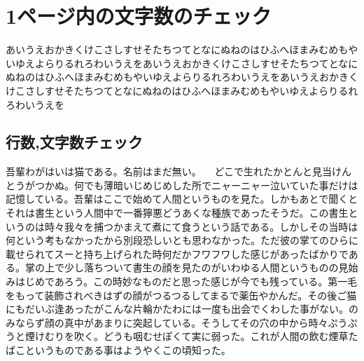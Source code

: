 \documentclass[main.tex]{subfiles}
\begin{document}
\setcounter{chapter}{0}     %

\chapter{1ページ内の文字数のチェック}
\thispagestyle{fancy}
あいうえおかきくけこさしすせそたちつてとなにぬねのはひふへほまみむめもやいゆえよらりるれろわいうえをあいうえおかきくけこさしすせそたちつてとなにぬねのはひふへほまみむめもやいゆえよらりるれろわいうえをあいうえおかきくけこさしすせそたちつてとなにぬねのはひふへほまみむめもやいゆえよらりるれろわいうえを


\section{行数,文字数チェック}
吾輩わがはいは猫である。名前はまだ無い。
　どこで生れたかとんと見当けんとうがつかぬ。何でも薄暗いじめじめした所でニャーニャー泣いていた事だけは記憶している。吾輩はここで始めて人間というものを見た。しかもあとで聞くとそれは書生という人間中で一番獰悪どうあくな種族であったそうだ。この書生というのは時々我々を捕つかまえて煮にて食うという話である。しかしその当時は何という考もなかったから別段恐しいとも思わなかった。ただ彼の掌てのひらに載せられてスーと持ち上げられた時何だかフワフワした感じがあったばかりである。掌の上で少し落ちついて書生の顔を見たのがいわゆる人間というものの見始みはじめであろう。この時妙なものだと思った感じが今でも残っている。第一毛をもって装飾されべきはずの顔がつるつるしてまるで薬缶やかんだ。その後ご猫にもだいぶ逢あったがこんな片輪かたわには一度も出会でくわした事がない。のみならず顔の真中があまりに突起している。そうしてその穴の中から時々ぷうぷうと煙けむりを吹く。どうも咽むせぽくて実に弱った。これが人間の飲む煙草たばこというものである事はようやくこの頃知った。
\end{document}
